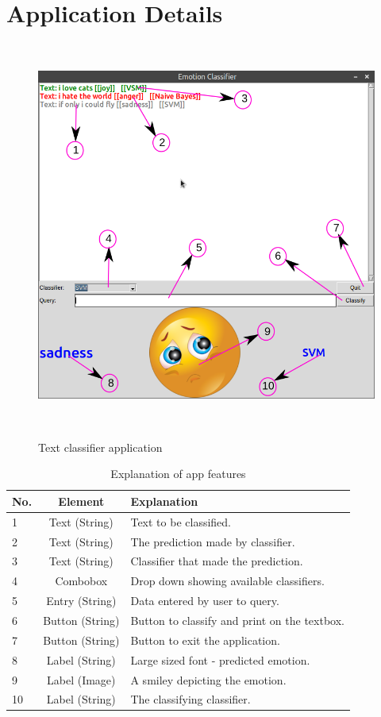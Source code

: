 \newpage
\section{Application Details}
\vspace*{-1cm}
\begin{figure}[ht!]
 \centering
 \caption{Text classifier application}
 \includegraphics[width=5in,height=5in]{app} 
 \label{fig-app-shot}
\end{figure}
\vspace*{-0.5cm}
\begin{table}[ht!]
\centering
\label{tab-app-exp}
\begin{tabular}{l|c|l}
\textbf{No.} & \textbf{Element} & \textbf{Explanation}\\
\hline
1 & Text (String) & Text to be classified. \\
2 & Text (String) & The prediction made by classifier. \\
3 & Text (String) & Classifier that made the prediction. \\
4 & Combobox & Drop down showing available classifiers. \\
5 & Entry (String) & Data entered by user to query. \\
6 & Button (String) & Button to classify and print on the textbox. \\
7 & Button (String) & Button to exit the application. \\
8 & Label (String) & Large sized font - predicted emotion. \\
9 & Label (Image) & A smiley depicting the emotion. \\
10 & Label (String) & The classifying classifier. \\
\end{tabular}
\caption{Explanation of app features}
\end{table}

